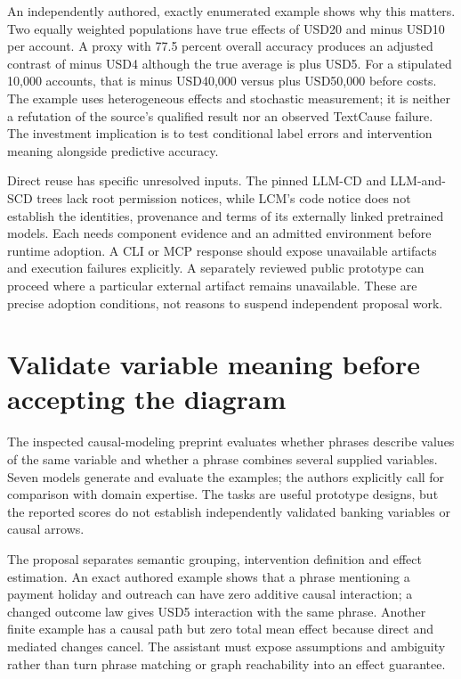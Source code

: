 An independently authored, exactly enumerated example shows why this
matters. Two equally weighted populations have true effects of USD20 and
minus USD10 per account. A proxy with 77.5 percent overall accuracy
produces an adjusted contrast of minus USD4 although the true average is
plus USD5. For a stipulated 10,000 accounts, that is minus USD40,000
versus plus USD50,000 before costs. The example uses heterogeneous
effects and stochastic measurement; it is neither a refutation of the
source's qualified result nor an observed TextCause failure. The
investment implication is to test conditional label errors and
intervention meaning alongside predictive accuracy.
\citep{exec28_lm_reference}

Direct reuse has specific unresolved inputs. The pinned LLM-CD and
LLM-and-SCD trees lack root permission notices, while LCM's code notice
does not establish the identities, provenance and terms of its
externally linked pretrained models. Each needs component evidence and
an admitted environment before runtime adoption. A CLI or MCP response
should expose unavailable artifacts and execution failures explicitly. A
separately reviewed public prototype can proceed where a particular
external artifact remains unavailable. These are precise adoption
conditions, not reasons to suspend independent proposal work.
\citep{exec28_lm_artifacts}

\hypertarget{validate-variable-meaning-before-accepting-the-diagram}{%
\section{Validate variable meaning before accepting the
diagram}\label{validate-variable-meaning-before-accepting-the-diagram}}

The inspected causal-modeling preprint evaluates whether phrases
describe values of the same variable and whether a phrase combines
several supplied variables. Seven models generate and evaluate the
examples; the authors explicitly call for comparison with domain
expertise. The tasks are useful prototype designs, but the reported
scores do not establish independently validated banking variables or
causal arrows. \citep{exec28_cm_razouk}

The proposal separates semantic grouping, intervention definition and
effect estimation. An exact authored example shows that a phrase
mentioning a payment holiday and outreach can have zero additive causal
interaction; a changed outcome law gives USD5 interaction with the same
phrase. Another finite example has a causal path but zero total mean
effect because direct and mediated changes cancel. The assistant must
expose assumptions and ambiguity rather than turn phrase matching or
graph reachability into an effect guarantee. \citep{exec28_cm_reference}

